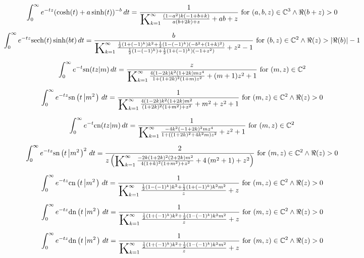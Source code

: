 \documentclass{article}
\newcommand{\bigK}{\mathop{\raisebox{-5pt}{\huge K}}}
\begin{document}
\[\int_0^{\infty } e^{-t z} (\cosh (t)+a \sinh (t))^{-b} \, dt=\frac{1}{\bigK_{k=1}^{\infty}\frac{\left(1-a^2\right) k (-1+b+k)}{a (b+2 k)+z}+a b+z}\text{ for }(a,b,z)\in \mathbb{C}^3\land \Re(b+z)>0\] 

\[\int_0^{\infty } e^{-t z} \text{sech}(t) \sinh (b t) \, dt=\frac{b}{\bigK_{k=1}^{\infty}\frac{\frac{1}{2} \left(1+(-1)^k\right) k^2+\frac{1}{2} \left(1-(-1)^k\right) \left(-b^2+(1+k)^2\right)}{\frac{1}{2} \left(1-(-1)^k\right)+\frac{1}{2} \left(1+(-1)^k\right) \left(-1+z^2\right)}+z^2-1}\text{ for }(b,z)\in \mathbb{C}^2\land \Re(z)>\left| \Re(b)\right| -1\] 

\[\int_0^{\infty } e^{-t} \text{sn}(t z|m) \, dt=\frac{z}{\bigK_{k=1}^{\infty}\frac{4 (1-2 k) k^2 (1+2 k) m z^4}{1+(1+2 k)^2 (1+m) z^2}+(m+1) z^2+1}\text{ for }(m,z)\in \mathbb{C}^2\] 

\[\int_0^{\infty } e^{-t z} \text{sn}\left(t\left|m^2\right.\right) \, dt=\frac{1}{\bigK_{k=1}^{\infty}\frac{4 (1-2 k) k^2 (1+2 k) m^2}{(1+2 k)^2 \left(1+m^2\right)+z^2}+m^2+z^2+1}\text{ for }(m,z)\in \mathbb{C}^2\land \Re(z)>0\] 

\[\int_0^{\infty } e^{-t} \text{cn}(t z|m) \, dt=\frac{1}{\bigK_{k=1}^{\infty}\frac{-4 k^2 (-1+2 k)^2 m z^4}{1+\left((1+2 k)^2+4 k^2 m\right) z^2}+z^2+1}\text{ for }(m,z)\in \mathbb{C}^2\] 

\[\int_0^{\infty } e^{-t z} \text{sn}\left(t\left|m^2\right.\right)^2 \, dt=\frac{2}{z \left(\bigK_{k=1}^{\infty}\frac{-2 k (1+2 k)^2 (2+2 k) m^2}{4 (1+k)^2 \left(1+m^2\right)+z^2}+4 \left(m^2+1\right)+z^2\right)}\text{ for }(m,z)\in \mathbb{C}^2\land \Re(z)>0\] 

\[\int_0^{\infty } e^{-t z} \text{cn}\left(t\left|m^2\right.\right) \, dt=\frac{1}{\bigK_{k=1}^{\infty}\frac{\frac{1}{2} \left(1-(-1)^k\right) k^2+\frac{1}{2} \left(1+(-1)^k\right) k^2 m^2}{z}+z}\text{ for }(m,z)\in \mathbb{C}^2\land \Re(z)>0\] 

\[\int_0^{\infty } e^{-t z} \text{dn}\left(t\left|m^2\right.\right) \, dt=\frac{1}{\bigK_{k=1}^{\infty}\frac{\frac{1}{2} \left(1+(-1)^k\right) k^2+\frac{1}{2} \left(1-(-1)^k\right) k^2 m^2}{z}+z}\text{ for }(m,z)\in \mathbb{C}^2\land \Re(z)>0\] 

\[\int_0^{\infty } e^{-t z} \text{dn}\left(t\left|m^2\right.\right) \, dt=\frac{1}{\bigK_{k=1}^{\infty}\frac{\frac{1}{2} \left(1+(-1)^k\right) k^2+\frac{1}{2} \left(1-(-1)^k\right) k^2 m^2}{z}+z}\text{ for }(m,z)\in \mathbb{C}^2\land \Re(z)>0\] 
\end{document}
